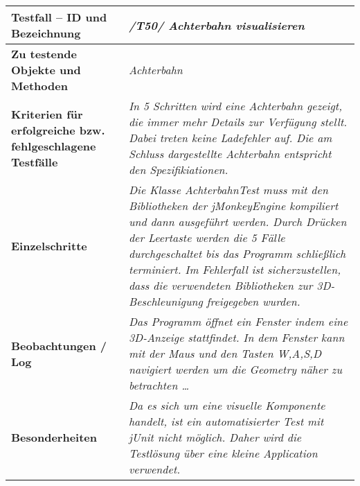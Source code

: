 
\begin{longtable}{|p{7cm}|p{10cm}|}
\hline
\textbf{Testfall -- ID und Bezeichnung} &  \textit{/T50/ Achterbahn visualisieren} \\
\hline
\textbf{Zu testende Objekte und Methoden} &  \textit{Achterbahn}
\\
\hline
\textbf{Kriterien für erfolgreiche bzw. fehlgeschlagene Testfälle} &
\textit{In 5 Schritten wird eine Achterbahn gezeigt, die immer mehr Details zur Verfügung stellt. Dabei treten keine Ladefehler auf. Die am Schluss dargestellte Achterbahn entspricht den Spezifikiationen. } \\
\hline
\textbf{Einzelschritte} &  \textit{ Die Klasse AchterbahnTest muss mit den Bibliotheken der jMonkeyEngine kompiliert und dann ausgeführt werden. Durch Drücken der Leertaste werden die 5 Fälle durchgeschaltet bis das 
Programm schließlich terminiert. Im Fehlerfall ist sicherzustellen, dass die verwendeten Bibliotheken zur 3D-Beschleunigung freigegeben wurden.
} \\
\hline
\textbf{Beobachtungen / Log} &  \textit{Das Programm öffnet ein Fenster indem eine 3D-Anzeige stattfindet. In dem Fenster kann mit der Maus und den Tasten W,A,S,D navigiert werden um die Geometry näher zu betrachten \ldots} \\
\hline
\textbf{Besonderheiten } &  \textit{Da es sich um eine visuelle Komponente handelt, ist ein automatisierter Test mit jUnit nicht möglich. Daher wird die Testlösung über eine kleine Application verwendet.} \\
\hline

 \end{longtable}






